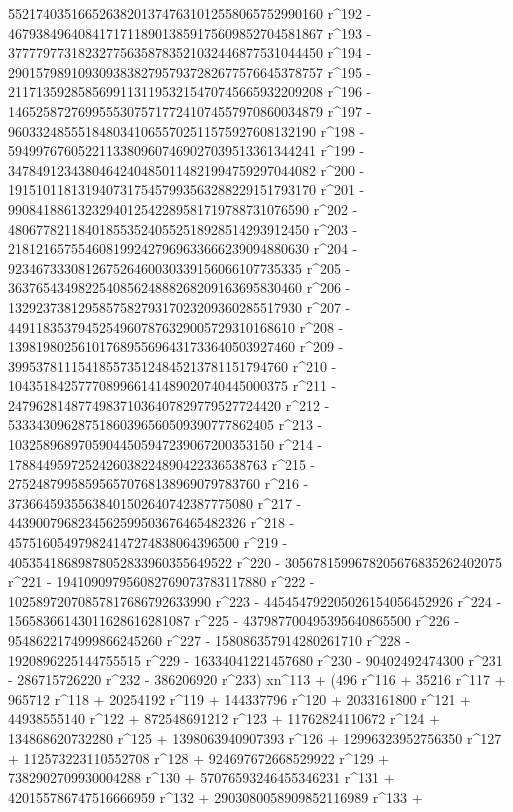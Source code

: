        552174035166526382013747631012558065752990160 r^192 - 
       467938496408417171189013859175609852704581867 r^193 - 
       377779773182327756358783521032446877531044450 r^194 - 
       290157989109309383827957937282677576645378757 r^195 - 
       211713592858569911311953215470745665932209208 r^196 - 
       146525872769955530757177241074557970860034879 r^197 - 
       96033248555184803410655702511575927608132190 r^198 - 
       59499767605221133809607469027039513361344241 r^199 - 
       34784912343804642404850114821994759297044082 r^200 - 
       19151011813194073175457993563288229151793170 r^201 - 
       9908418861323294012542289581719788731076590 r^202 - 
       4806778211840185535240552518928514293912450 r^203 - 
       2181216575546081992427969633666239094880630 r^204 - 
       923467333081267526460030339156066107735335 r^205 - 
       363765434982254085624888268209163695830460 r^206 - 
       132923738129585758279317023209360285517930 r^207 - 
       44911835379452549607876329005729310168610 r^208 - 
       13981980256101768955696431733640503927460 r^209 - 
       3995378111541855735124845213781151794760 r^210 - 
       1043518425777089966141489020740445000375 r^211 - 
       247962814877498371036407829779527724420 r^212 - 
       53334309628751860396560509390777862405 r^213 - 
       10325896897059044505947239067200353150 r^214 - 
       1788449597252426038224890422336538763 r^215 - 
       275248799585956570768138969079783760 r^216 - 
       37366459355638401502640742387775080 r^217 - 
       4439007968234562599503676465482326 r^218 - 
       457516054979824147274838064396500 r^219 - 
       40535418689878052833960355649522 r^220 - 
       3056781599678205676835262402075 r^221 - 
       194109097956082769073783117880 r^222 - 
       10258972070857817686792633990 r^223 - 
       445454792205026154056452926 r^224 - 
       15658366143011628616281087 r^225 - 
       437987700495395640865500 r^226 - 
       9548622174999866245260 r^227 - 158086357914280261710 r^228 - 
       1920896225144755515 r^229 - 16334041221457680 r^230 - 
       90402492474300 r^231 - 286715726220 r^232 - 
       386206920 r^233) xn^113 + (496 r^116 + 35216 r^117 + 
       965712 r^118 + 20254192 r^119 + 144337796 r^120 + 
       2033161800 r^121 + 44938555140 r^122 + 872548691212 r^123 + 
       11762824110672 r^124 + 134868620732280 r^125 + 
       1398063940907393 r^126 + 12996323952756350 r^127 + 
       112573223110552708 r^128 + 924697672668529922 r^129 + 
       7382902709930004288 r^130 + 57076593246455346231 r^131 + 
       420155786747516666959 r^132 + 2903080058909852116989 r^133 + 
